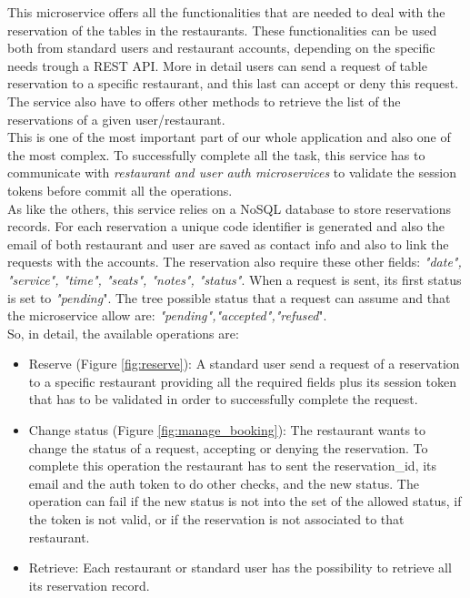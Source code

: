 This microservice offers all the functionalities that are needed to deal with the reservation of the tables in the restaurants. These functionalities can be used both from standard users and restaurant accounts, depending on the specific needs trough a REST API. More in detail users can send a request of table reservation to a specific restaurant, and this last can accept or deny this request. The service also have to offers other methods to retrieve the list of the reservations of a given user/restaurant. \\
This is one of the most important part of our whole application and also one of the most complex. To successfully complete all the task, this service has to communicate with \textit{ restaurant and user auth microservices } to validate the session tokens before commit all the operations. \\
As like the others, this service relies on a NoSQL database to store reservations records. For each reservation a unique code identifier is generated and also the email of both restaurant and user are saved as contact info and also to link the requests with the accounts. The reservation also require these other fields: \textit{"date", "service", "time", "seats", "notes", "status"}. When a request is sent, its first status is set to \textit{"pending}". The tree possible status that a request can assume and that the microservice allow are: \textit{"pending","accepted","refused}".\\
So, in detail, the available operations are:

\begin{itemize}
    \item Reserve (Figure \ref{fig:reserve}): A standard user  send a request of a reservation to a specific restaurant providing all the required fields plus its session token that has to be validated in order to successfully complete the request. 
    \item Change status  (Figure \ref{fig:manage_booking}): The restaurant wants to change the status of a request, accepting or denying the reservation. To complete this operation the restaurant has to sent the reservation\_id, its email and the auth token to do other checks, and the new status. The operation can fail if the new status is not into the set of the allowed status, if the token is not valid, or if the reservation is not associated to that restaurant.
    \item Retrieve: Each restaurant or standard user has the possibility to retrieve all its reservation record.
    
\end{itemize}


